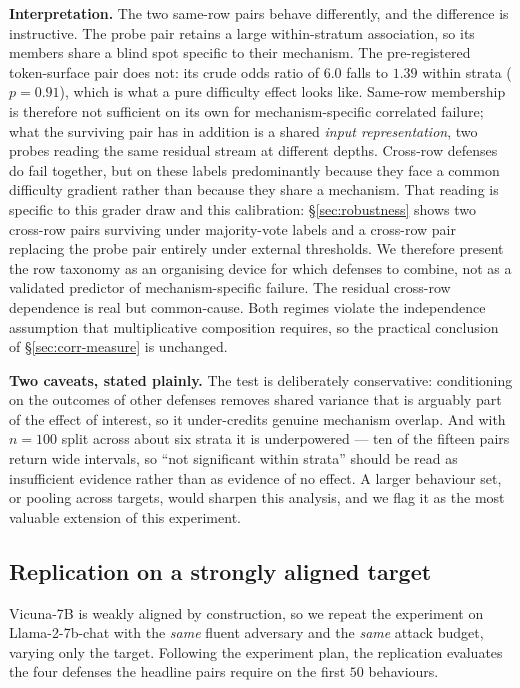 \textbf{Interpretation.} The two same-row pairs behave differently, and the difference is
instructive. The probe pair retains a large within-stratum association, so its members share a
blind spot specific to their mechanism. The pre-registered token-surface pair does not: its
crude odds ratio of $6.0$ falls to $1.39$ within strata ($p=0.91$), which is what a pure
difficulty effect looks like. Same-row membership is therefore not sufficient on its own for
mechanism-specific correlated failure; what the surviving pair has in addition is a shared
\emph{input representation}, two probes reading the same residual stream at different depths.
Cross-row defenses do fail together,
but on these labels predominantly because they face a common difficulty gradient rather than
because they share a mechanism. That reading is specific to this grader draw and this
calibration: \S\ref{sec:robustness} shows two cross-row pairs surviving under majority-vote
labels and a cross-row pair replacing the probe pair entirely under external thresholds. We
therefore present the row taxonomy as an organising device for which defenses to combine, not
as a validated predictor of mechanism-specific failure. The residual
cross-row dependence is real but common-cause. Both regimes violate the independence
assumption that multiplicative composition requires, so the practical conclusion of
\S\ref{sec:corr-measure} is unchanged.

\textbf{Two caveats, stated plainly.} The test is deliberately conservative: conditioning on
the outcomes of other defenses removes shared variance that is arguably part of the effect
of interest, so it under-credits genuine mechanism overlap. And with $n=100$ split across
about six strata it is underpowered --- ten of the fifteen pairs return wide intervals, so
``not significant within strata'' should be read as insufficient evidence rather than as
evidence of no effect. A larger behaviour set, or pooling across targets, would sharpen
this analysis, and we flag it as the most valuable extension of this experiment.

\subsection{Replication on a strongly aligned target}
\label{sec:replication}

Vicuna-7B is weakly aligned by construction, so we repeat the experiment on
Llama-2-7b-chat with the \emph{same} fluent adversary and the \emph{same} attack budget,
varying only the target. Following the experiment plan, the replication evaluates the four
defenses the headline pairs require on the first $50$ behaviours.

